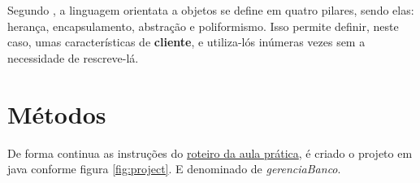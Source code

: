 \par Segundo , a linguagem orientata a objetos se define em quatro pilares, sendo elas: herança, encapsulamento, abstração e poliformismo. Isso permite definir, neste caso, umas características de \textbf{cliente}, e utiliza-lós inúmeras vezes sem a necessidade de rescreve-lá.

\section{Métodos}
\par De forma continua as instruções do \href{https://github.com/OgliariNatan/gerenciaBanco/blob/main/Aula%20pr%C3%A1tica.pdf}{roteiro da aula prática}, é criado o projeto em java conforme figura \ref{fig:project}. E denominado de \textit{gerenciaBanco}.

